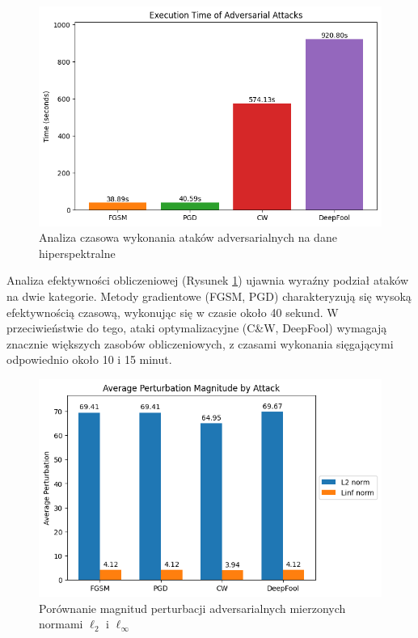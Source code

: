 \documentclass[12pt]{article}
\begin{document}
\begin{figure}[H]
    \centering
    \includegraphics[width=1\textwidth]{hybridsn_time.png} 
    \caption{Analiza czasowa wykonania ataków adversarialnych na dane hiperspektralne}
    \label{fig:hyperspectral-time}
\end{figure}

Analiza efektywności obliczeniowej (Rysunek \ref{fig:hyperspectral-time}) ujawnia wyraźny podział ataków na dwie kategorie. Metody gradientowe (FGSM, PGD) charakteryzują się wysoką efektywnością czasową, wykonując się w czasie około 40 sekund. W przeciwieństwie do tego, ataki optymalizacyjne (C\&W, DeepFool) wymagają znacznie większych zasobów obliczeniowych, z czasami wykonania sięgającymi odpowiednio około 10 i 15 minut.

\begin{figure}[H]
    \centering
    \includegraphics[width=1\textwidth]{perturbations.png} 
    \caption{Porównanie magnitud perturbacji adversarialnych mierzonych normami $\ell_2$ i $\ell_\infty$}
\end{figure}
\end{document}
